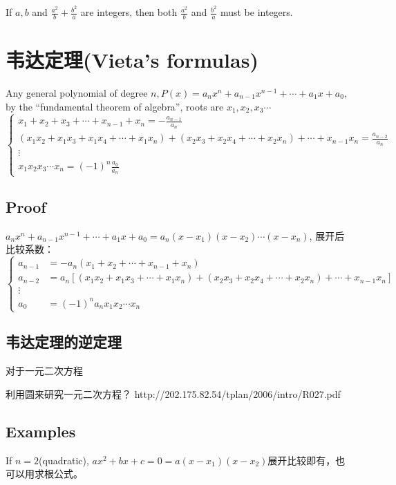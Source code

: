 \documentclass[../main.tex]{subfiles}
\begin{document}
If $a, b$ and $\frac{a^2}{b}+\frac{b^2}{a}$ are integers, then both $\frac{a^2}{b}$ and $\frac{b^2}{a}$ must be integers.

\section{韦达定理(Vieta's formulas)}
Any general polynomial of degree $n, P(x)=a_{n}x^{n}+ a_{n-1}x^{n-1}+\cdots +a_1x+a_{0}$, by the ``fundamental theorem of algebra'', roots are $x_1, x_2, x_3\cdots$
\[
  \begin{cases}
    x_1+x_2+x_3+\cdots + x_{n-1}+ x_{n} = -\frac{a_{n-1}}{a_{n}}\\
    (x_1x_2+x_1x_3+x_1x_4+\cdots +x_1x_{n})+(x_2x_3+x_2x_4+\cdots +x_2x_{n})+\cdots + x_{n-1}x_{n} = \frac{a_{n-2}}{a_{n}}\\
    \vdots\\
    x_1x_2x_3\cdots x_{n} = (-1)^{n}\frac{a_{0}}{a_{n}}
  \end{cases}
\]

\subsection{Proof}
$a_{n}x^{n}+a_{n-1}x^{n-1}+\cdots + a_1x + a_{0} = a_{n}(x-x_1)(x-x_2)\cdots (x-x_{n}) $, 展开后比较系数：
\[
  \left\{
    \begin{array}{ll}
      a_{n-1} &= -a_{n}(x_1+x_2+\cdots + x_{n-1}+ x_{n})\\
      a_{n-2} &= a_{n}[(x_1x_2+x_1x_3+\cdots +x_1x_{n})+ (x_2x_3+ x_2x_4+\cdots + x_2x_{n})+\cdots + x_{n-1}x_{n}]\\
      \vdots \\
      a_{0} &= (-1)^{n}a_{n}x_1x_2\cdots x_{n}
    \end{array}
  \right.
\]

\subsection{韦达定理的逆定理}
对于一元二次方程

利用圆来研究一元二次方程？  http://202.175.82.54/tplan/2006/intro/R027.pdf

\subsection{Examples}
If $n=2$(quadratic), $ax^2+bx+c=0 = a(x-x_1)(x-x_2)$展开比较即有，也可以用求根公式。
\end{document}
